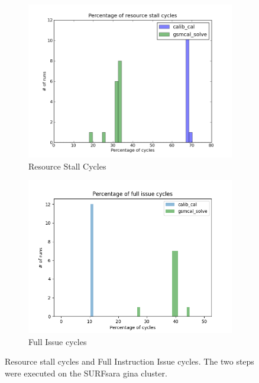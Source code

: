 \begin{figure}
  \centering
      \begin{subfigure}{.45\textwidth}
      \includegraphics[width=\textwidth]{ch4/figures/rstall.png}
      \caption{Resource Stall Cycles}
	\label{fig:ch4_rstall}
    \end{subfigure}
    \begin{subfigure}{.45\textwidth}
    \includegraphics[width=\textwidth]{ch4/figures/full_issue.png}
      \caption{Full Issue cycles }
	\label{fig:ch4_full_issue}
  \end{subfigure}
  \label{fig:ch4_rr}
    \caption[Resource stall cycles and Full Instruction Issue cycles.]{Resource stall cycles and Full Instruction Issue cycles. The two steps were  executed on the SURFsara gina cluster. }
\end{figure}

